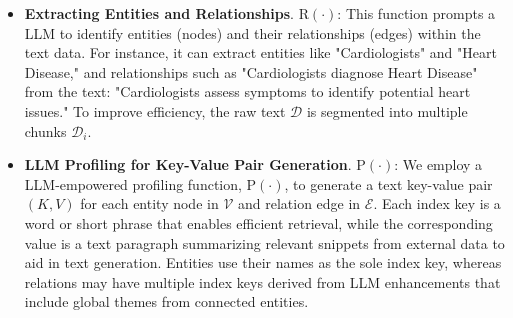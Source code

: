 \begin{itemize}[leftmargin=*]


    \item \textbf{Extracting Entities and Relationships}. $\text{R}(\cdot)$: This function prompts a LLM to identify entities (nodes) and their relationships (edges) within the text data. For instance, it can extract entities like "Cardiologists" and "Heart Disease," and relationships such as "Cardiologists diagnose Heart Disease" from the text: "Cardiologists assess symptoms to identify potential heart issues." To improve efficiency, the raw text $\mathcal{D}$ is segmented into multiple chunks $\mathcal{D}_i$.
    

    \item \textbf{LLM Profiling for Key-Value Pair Generation}. $\text{P}(\cdot)$: We employ a LLM-empowered profiling function, $\text{P}(\cdot)$, to generate a text key-value pair $(K, V)$ for each entity node in $\mathcal{V}$ and relation edge in $\mathcal{E}$. Each index key is a word or short phrase that enables efficient retrieval, while the corresponding value is a text paragraph summarizing relevant snippets from external data to aid in text generation. Entities use their names as the sole index key, whereas relations may have multiple index keys derived from LLM enhancements that include global themes from connected entities.
    

\end{itemize}
